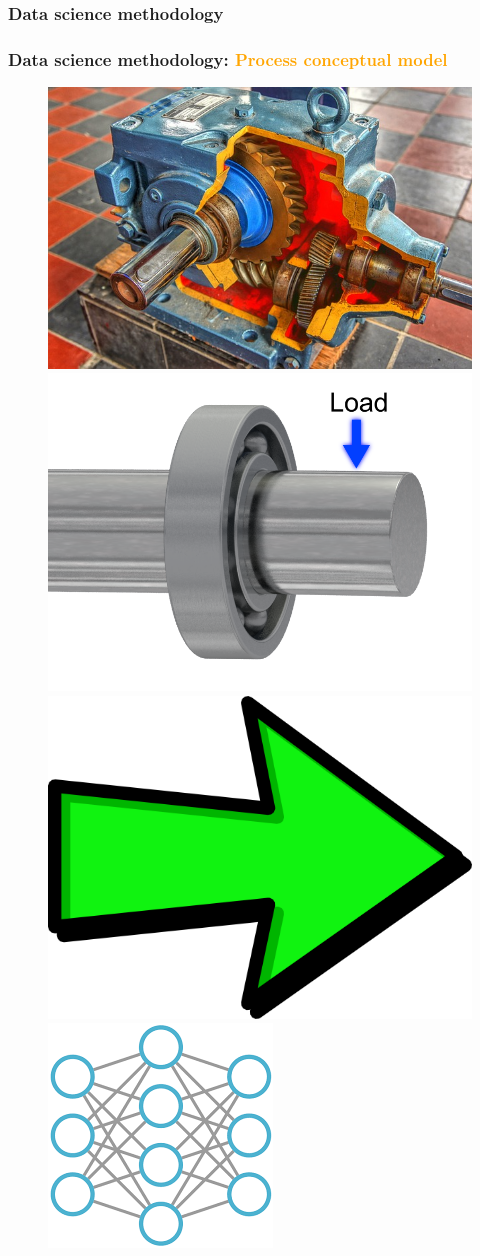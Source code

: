 \documentclass{beamer}
\begin{document}
\begin{frame}
	\frametitle{Data science methodology}
\begin{figure}[H]
	\begin{center}
	\end{center}

\end{figure}
\end{frame}
\begin{frame}
	\frametitle{Data science methodology: \textcolor{orange}{Process conceptual model}}
\begin{figure}[H]
	\centering
	\includegraphics[width=0.2\linewidth]{gearbox}
	\includegraphics[width=0.2\linewidth]{bearing}
	\includegraphics[width=0.2\linewidth]{arrow}
	\includegraphics[width=0.3\linewidth]{conceptual}
\end{figure}
\end{frame}
\end{document}
